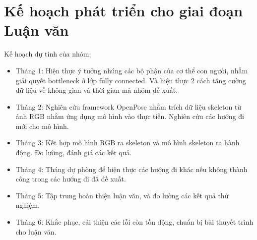 \section{Kế hoạch phát triển cho giai đoạn Luận văn}

Kế hoạch dự tính của nhóm:

\begin{itemize}
    \item Tháng 1: Hiện thực ý tưởng nhúng các bộ phận của cơ thể con người, nhằm giải quyết bottleneck ở lớp fully connected. Và hiện thực 2 cách tăng cường dữ liệu về không gian và thời gian mà nhóm đề xuất.
    \item Tháng 2: Nghiên cứu framework OpenPose nhằm trích dữ liệu skeleton từ ảnh RGB nhằm ứng dụng mô hình vào thực tiễn. Nghiên cứu các hướng đi mới cho mô hình.
    \item Tháng 3: Kết hợp mô hình RGB ra skeleton và mô hình skeleton ra hành động. Đo lường, đánh giá các kết quả.
    \item Tháng 4: Tháng dự phòng để hiện thực các hướng đi khác nếu không thành công trong các hướng đi đã đề xuất.
    \item Tháng 5: Tập trung hoàn thiện luận văn, và đo lường các kết quả thử nghiệm.
    \item Tháng 6: Khắc phục, cải thiện các lỗi còn tồn động, chuẩn bị bài thuyết trình cho luận văn.
\end{itemize}

